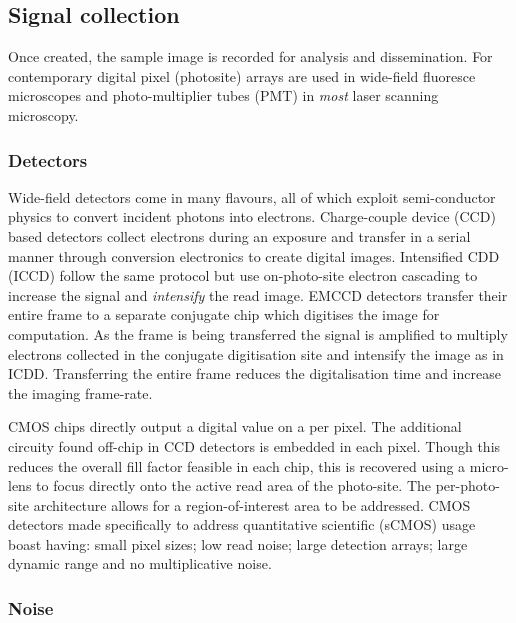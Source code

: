 \subsection{Signal collection}

Once created, the sample image is recorded for analysis and dissemination.
For contemporary digital pixel (photosite) arrays are used in wide-field fluoresce microscopes and photo-multiplier tubes (PMT) in \emph{most} laser scanning microscopy.

\subsubsection{Detectors}

Wide-field detectors come in many flavours, all of which exploit semi-conductor physics to convert incident photons into electrons.
Charge-couple device (CCD) based detectors collect electrons during an exposure and transfer in a serial manner through conversion electronics to create digital images.
Intensified CDD (ICCD) follow the same protocol but use on-photo-site electron cascading to increase the signal and \emph{intensify} the read image.
EMCCD detectors transfer their entire frame to a separate conjugate chip which digitises the image for computation.
As the frame is being transferred the signal is amplified to multiply electrons collected in the conjugate digitisation site and intensify the image as in ICDD.
Transferring the entire frame reduces the digitalisation time and increase the imaging frame-rate.

CMOS chips directly output a digital value on a per pixel.
The additional circuity found off-chip in CCD detectors is embedded in each pixel.
Though this reduces the overall fill factor feasible in each chip, this is recovered using a micro-lens to focus directly onto the active read area of the photo-site.
The per-photo-site architecture allows for a region-of-interest area to be addressed.
CMOS detectors made specifically to address quantitative scientific (sCMOS) usage boast having: small pixel sizes; low read noise; large detection arrays; large dynamic range and no multiplicative noise.




\subsubsection{Noise}

